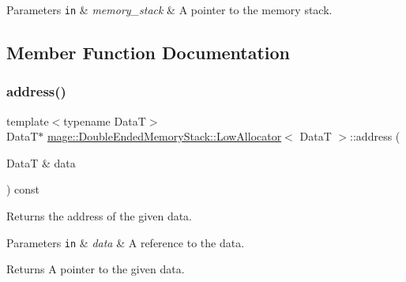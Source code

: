 \begin{DoxyParams}[1]{Parameters}
\mbox{\tt in}  & {\em memory\+\_\+stack} & A pointer to the memory stack. \\
\hline
\end{DoxyParams}


\subsection{Member Function Documentation}
\hypertarget{structmage_1_1_double_ended_memory_stack_1_1_low_allocator_a5c8652dba997772c31e4d9fe3544d800}{}\label{structmage_1_1_double_ended_memory_stack_1_1_low_allocator_a5c8652dba997772c31e4d9fe3544d800} 
\subsubsection{\texorpdfstring{address()}{address()}\hspace{0.1cm}{\footnotesize\ttfamily [1/2]}}
{\footnotesize\ttfamily template$<$typename DataT$>$ \\
DataT$\ast$ \hyperlink{structmage_1_1_double_ended_memory_stack_1_1_low_allocator}{mage\+::\+Double\+Ended\+Memory\+Stack\+::\+Low\+Allocator}$<$ DataT $>$\+::address (\begin{DoxyParamCaption}\item[{DataT \&}]{data }\end{DoxyParamCaption}) const\hspace{0.3cm}{\ttfamily [noexcept]}}

Returns the address of the given data.


\begin{DoxyParams}[1]{Parameters}
\mbox{\tt in}  & {\em data} & A reference to the data. \\
\hline
\end{DoxyParams}
\begin{DoxyReturn}{Returns}
A pointer to the given data. 
\end{DoxyReturn}
\hypertarget{structmage_1_1_double_ended_memory_stack_1_1_low_allocator_a2534642d00a890a97b262c47388c2c60}{}\label{structmage_1_1_double_ended_memory_stack_1_1_low_allocator_a2534642d00a890a97b262c47388c2c60} 
